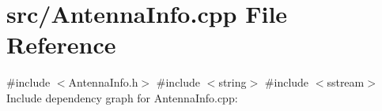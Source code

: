 \section{src/\+Antenna\+Info.cpp File Reference}
\label{_antenna_info_8cpp}
{\ttfamily \#include $<$Antenna\+Info.\+h$>$}\newline
{\ttfamily \#include $<$string$>$}\newline
{\ttfamily \#include $<$sstream$>$}\newline
Include dependency graph for Antenna\+Info.\+cpp\+:
